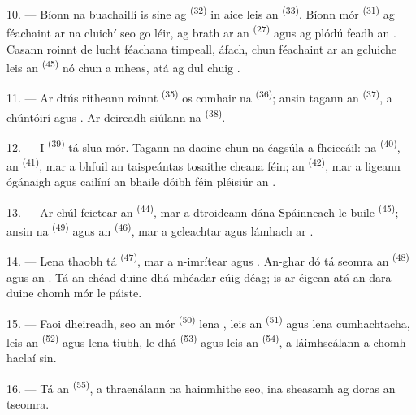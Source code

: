 10. --- Bíonn na buachaillí is sine ag 
\textsuperscript{(32)} in aice leis an  \textsuperscript{(33)}. Bíonn
 mór \textsuperscript{(31)} ag féachaint ar na cluichí seo go léir, ag
brath ar  an  \textsuperscript{(27)} agus ag
plódú feadh an . Casann roinnt de lucht féachana timpeall, áfach,
chun féachaint ar an gcluiche leis an  \textsuperscript{(45)} nó
chun  a mheas, atá ag dul chuig .

11. --- Ar dtús ritheann roinnt  \textsuperscript{(35)} os comhair na
 \textsuperscript{(36)}; ansin tagann an 
\textsuperscript{(37)}, a chúntóirí agus . Ar deireadh
siúlann na  \textsuperscript{(38)}.

\VUsaut{5.0mm}
\VUsaut{3.6mm}

12. --- I  \textsuperscript{(39)} tá slua mór. Tagann na
daoine chun na  éagsúla a fheiceáil: na
 \textsuperscript{(40)}, an 
\textsuperscript{(41)}, mar a bhfuil an taispeántas tosaithe cheana féin; an
 \textsuperscript{(42)}, mar a ligeann ógánaigh agus cailíní
an bhaile dóibh féin pléisiúr an .

13. --- Ar chúl feictear an  \textsuperscript{(44)}, mar a
dtroideann  dána Spáinneach le  buile
\textsuperscript{(45)}; ansin na 
\textsuperscript{(49)} agus an  \textsuperscript{(46)}, mar a
gcleachtar  agus lámhach ar .

14. --- Lena thaobh tá  \textsuperscript{(47)}, mar a
n-imrítear  agus . An-ghar dó tá seomra an
 \textsuperscript{(48)} agus an . Tá
 an chéad duine dhá mhéadar cúig déag; is ar éigean atá an dara duine
chomh mór le páiste.

15. --- Faoi dheireadh, seo an  mór \textsuperscript{(50)}
lena , leis an  \textsuperscript{(51)} agus
lena  cumhachtacha, leis an  \textsuperscript{(52)} agus
lena  tiubh, le dhá  \textsuperscript{(53)} agus
leis an  \textsuperscript{(54)}, a láimhseálann a
 chomh haclaí sin.

16. --- Tá an  \textsuperscript{(55)}, a thraenálann na
hainmhithe seo, ina sheasamh ag doras an tseomra.
\VUsaut{6.0mm}
\VUfilet{22mm}

